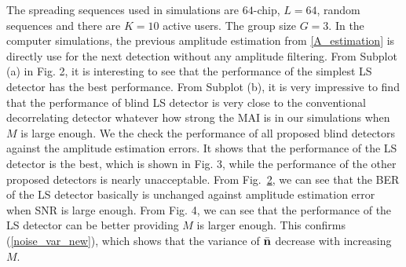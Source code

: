 \documentclass[a4paper,10pt,fleqn, twocolumn]{IEEETran}
\newcommand{\bn}{{\bf n}}
\begin{document}
The spreading sequences used in simulations are $64$-chip, $L=64$,
random sequences and there are $K=10$ active users. The group size
$G=3$. In the computer simulations, the previous amplitude
estimation from \ref{A_estimation} is directly use for the next
detection without any amplitude filtering. From Subplot (a) in
Fig. 2, it is interesting to see that the performance of the
simplest LS detector has the best performance. From Subplot (b),
it is very impressive to find that the performance of blind LS
detector is very close to the conventional decorrelating detector
whatever how strong the MAI is in our simulations when $M$ is
large enough. We the check the performance of all proposed blind
detectors against the amplitude estimation errors. It shows that
the performance of the LS detector is the best, which is shown in
Fig. 3, while the performance of the other proposed detectors is
nearly unacceptable. From Fig.~\ref{BER_A_SNR}, we can see that
the BER of the LS detector basically is unchanged against
amplitude estimation error when SNR is large enough. From Fig. 4,
we can see that the performance of the LS detector can be better
providing $M$ is larger enough. This confirms
(\ref{noise_var_new}), which shows that the variance of
$\bar{\bn}$ decrease with increasing $M$.

\begin{figure} \label{BER_SNR}
\end{figure}

\begin{figure} \label{BER_A_SNR}
\end{figure}
\end{document}

